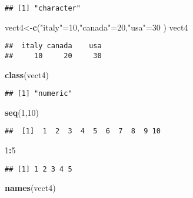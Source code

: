 \documentclass[
]{article}
\newenvironment{Shaded}{\begin{snugshade}}{\end{snugshade}}
\newcommand{\DecValTok}[1]{\textcolor[rgb]{0.00,0.00,0.81}{#1}}
\newcommand{\FunctionTok}[1]{\textcolor[rgb]{0.13,0.29,0.53}{\textbf{#1}}}
\newcommand{\NormalTok}[1]{#1}
\newcommand{\OtherTok}[1]{\textcolor[rgb]{0.56,0.35,0.01}{#1}}
\newcommand{\SpecialCharTok}[1]{\textcolor[rgb]{0.81,0.36,0.00}{\textbf{#1}}}
\newcommand{\StringTok}[1]{\textcolor[rgb]{0.31,0.60,0.02}{#1}}
\begin{document}
\begin{verbatim}
## [1] "character"
\end{verbatim}

\begin{Shaded}
\begin{Highlighting}[]
\NormalTok{vect4}\OtherTok{\textless{}{-}}\FunctionTok{c}\NormalTok{(}\StringTok{"italy"}\OtherTok{=}\DecValTok{10}\NormalTok{,}\StringTok{"canada"}\OtherTok{=}\DecValTok{20}\NormalTok{,}\StringTok{"usa"}\OtherTok{=}\DecValTok{30}\NormalTok{ )}
\NormalTok{vect4}
\end{Highlighting}
\end{Shaded}

\begin{verbatim}
##  italy canada    usa 
##     10     20     30
\end{verbatim}

\begin{Shaded}
\begin{Highlighting}[]
\FunctionTok{class}\NormalTok{(vect4)}
\end{Highlighting}
\end{Shaded}

\begin{verbatim}
## [1] "numeric"
\end{verbatim}

\begin{Shaded}
\begin{Highlighting}[]
\FunctionTok{seq}\NormalTok{(}\DecValTok{1}\NormalTok{,}\DecValTok{10}\NormalTok{)}
\end{Highlighting}
\end{Shaded}

\begin{verbatim}
##  [1]  1  2  3  4  5  6  7  8  9 10
\end{verbatim}

\begin{Shaded}
\begin{Highlighting}[]
\DecValTok{1}\SpecialCharTok{:}\DecValTok{5}
\end{Highlighting}
\end{Shaded}

\begin{verbatim}
## [1] 1 2 3 4 5
\end{verbatim}

\begin{Shaded}
\begin{Highlighting}[]
\FunctionTok{names}\NormalTok{(vect4)}
\end{Highlighting}
\end{Shaded}
\end{document}
